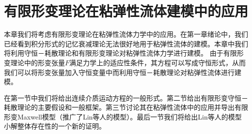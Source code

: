 \chapter{有限形变理论在粘弹性流体建模中的应用}


% 
本章我们将考虑有限形变理论在粘弹性流体力学中的应用。在第一章绪论中，我们已经看到积分形式的记忆衰减理论无法很好地用于粘弹性流体的建模。本章中我们将利用守恒－耗散理论和有限形变理论对粘弹性流体力学进行建模。
由于有限形变理论中的形变张量$F$满足力学上的适应性条件，其方程可以写成守恒形式，从而我们可以将形变张量加入守恒变量中而利用守恒－耗散理论对粘弹性流体进行建模。

在第一节中我们将给出连续介质运动方程的一般形式。第二节给出有限形变守恒－耗散理论的主要假设和一般框架。第三节讨论其在粘弹性流体中的应用并导出有限形变Maxwell模型（推广了Lin等人的模型）。最后一节我们将给出Lin等人的模型小解整体存在性的一个新的证明。

